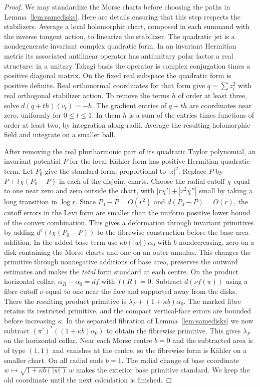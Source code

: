 \begin{proof}
We may standardize the Morse charts before choosing the paths in Lemma~\ref{lem:samedisks}. Here are details ensuring that this step respects the stabilizers. Average a local holomorphic chart, composed in each summand with the inverse tangent action, to linearize the stabilizer. The quadratic jet is a nondegenerate invariant complex quadratic form. In an invariant Hermitian metric its associated antilinear operator has antiunitary polar factor a real structure: in a unitary Takagi basis the operator is complex conjugation times a positive diagonal matrix. On the fixed real subspace the quadratic form is positive definite. Real orthonormal coordinates for that form give $q=\sum z_i^2$ with real orthogonal stabilizer action. To remove the terms $h$ of order at least three, solve $d(q+th)(v_t)=-h$. The gradient entries of $q+th$ are coordinates near zero, uniformly for $0\le t\le1$. In them $h$ is a sum of the entries times functions of order at least two, by integration along radii. Average the resulting holomorphic field and integrate on a smaller ball.

After removing the real pluriharmonic part of its quadratic Taylor polynomial, an invariant potential $P$ for the local Kähler form has positive Hermitian quadratic term. Let $P_0$ give the standard form, proportional to $|z|^2$. Replace $P$ by $P+t\chi(P_0-P)$ in each of the disjoint charts. Choose the radial cutoff $\chi$ equal to one near zero and zero outside the chart, with $|r\chi'|+|r^2\chi''|$ small by taking a long transition in $\log r$. Since $P_0-P=O(r^2)$ and $d(P_0-P)=O(r)$, the cutoff errors in the Levi form are smaller than the uniform positive lower bound of the convex combination. This gives a deformation through invariant primitives by adding $d^c(t\chi(P_0-P))$ to the fibrewise construction before the base-area addition. In the added base term use $\kappa b(|w|)\alpha_0$ with $b$ nondecreasing, zero on a disk containing the Morse charts and one on an outer annulus. This changes the primitive through nonnegative additions of base area, preserves the outward estimates and makes the \emph{total} form standard at each centre. On the product horizontal collar, $\alpha_R-\alpha_0=df$ with $f(R)=0$. Subtract $d(\nu f(\pi))$ using a fibre cutoff $\nu$ equal to one near the face and supported away from the disks. There the resulting product primitive is $\lambda_F+(1+\kappa b)\alpha_0$. The marked fibre retains its restricted primitive, and the compact vertical-face errors are bounded before increasing $\kappa$. In the separated fibration of Lemma~\ref{lem:samedisks} we now subtract $(\pi')^*((1+\kappa b)\alpha_0)$ to obtain the fibrewise primitive. This gives $\lambda_F$ on the horizontal collar. Near each Morse centre $b=0$ and the subtracted area is of type $(1,1)$ and vanishes at the centre, so the fibrewise form is Kähler on a smaller chart. On all radial ends $b=1$. The radial change of base coordinate $w\mapsto\sqrt{1+\kappa b(|w|)}\,w$ makes the exterior base primitive standard. We keep the old coordinate until the next calculation is finished.


\end{proof}
